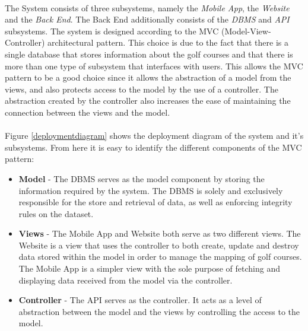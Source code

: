 \documentclass{article}
\begin{document}
    \paragraph{}
    The System consists of three subsystems, namely the \textit{Mobile App}, the
    \textit{Website} and the \textit{Back End}. The Back End additionally
    consists of the \textit{DBMS} and \textit{API} subsystems. The system is
    designed according to the MVC (Model-View-Controller) architectural pattern.
    This choice is due to the fact that there is a single database that stores
    information about the golf courses and that there is more than one type of
    subsystem that interfaces with users. This allows the MVC pattern to be a
    good choice since it allows the abstraction of a model from the views, and
    also protects access to the model by the use of a controller. The
    abstraction created by the controller also increases the ease of maintaining
    the connection between the views and the model.

    \paragraph{}
    Figure \ref{deploymentdiagram} shows the deployment diagram of the system and it's
    subsystems. From here it is easy to identify the different components of the
    MVC pattern:

    \begin{itemize}
        \item \textbf{Model} - The DBMS serves as the model component by storing
            the information required by the system. The DBMS is solely and
            exclusively responsible for the store and retrieval of data,
            as well as enforcing integrity rules on the dataset.
        \item \textbf{Views} - The Mobile App and Website both serve as two
            different views. The Website is a view that uses the controller
            to both create, update and destroy data stored within the model
            in order to manage the mapping of golf courses. The Mobile App is
            a simpler view with the sole purpose of fetching and displaying
            data received from the model via the controller.
        \item \textbf{Controller} - The API serves as the controller. It acts
            as a level of abstraction between the model and the views by
            controlling the access to the model.
    \end{itemize}
\end{document}
